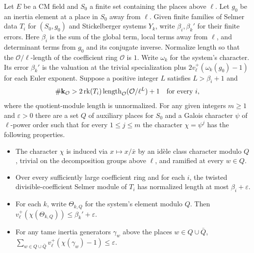 \begin{lemma}
\label{lem:c-selmer-general-twist}
\emitthmsource
Let $E$ be a CM field and $S_0$ a finite set containing the places above $\ell$. Let $g_0$ be an inertia element at a place in $S_0$ away from $\ell$. Given finite families of Selmer data $T_i$ for $(S_0,g_0)$ and Stickelberger systems $Y_k$, write $\beta_i,\beta_k'$ for their finite errors. Here $\beta_i$ is the sum of the global term, local terms away from $\ell$, and determinant terms from $g_0$ and its conjugate inverse. Normalize length so that the $\mathcal O/\ell$-length of the coefficient ring $\mathcal O$ is $1$. Write $\omega_k$ for the system's character. Its error $\beta_k'$ is the valuation at the trivial specialization plus $2v_\ell^+(\omega_k(g_0)-1)$ for each Euler exponent. Suppose a positive integer $L$ satisfies $L>\beta_i+1$ and
\[
 \#\mathbf k_{\mathcal O}>2\operatorname{rk}(T_i)\operatorname{length}_{\mathcal O}(\mathcal O/\ell^L)+1
 \quad\hbox{for every }i ,
\]
where the quotient-module length is unnormalized. For any given integers $m\ge1$ and $\varepsilon>0$ there are a set $Q$ of auxiliary places for $S_0$ and a Galois character $\psi$ of $\ell$-power order such that for every $1\le j\le m$ the character $\chi=\psi^j$ has the following properties.

\begin{itemize}
\item The character $\chi$ is induced via $x\mapsto x/\bar x$ by an idèle class character modulo $Q$, trivial on the decomposition groups above $\ell$, and ramified at every $w\in Q$.
\item Over every sufficiently large coefficient ring and for each $i$, the twisted divisible-coefficient Selmer module of $T_i$ has normalized length at most $\beta_i+\varepsilon$.
\item For each $k$, write $\Theta_{k,Q}$ for the system's element modulo $Q$. Then $v_\ell^+(\chi(\Theta_{k,Q}))\le\beta_k'+\varepsilon$.
\item For any tame inertia generators $\gamma_w$ above the places $w\in Q\cup\bar Q$,
$\sum_{w\in Q\cup\bar Q}v_\ell^+(\chi(\gamma_w)-1)\le\varepsilon$.
\end{itemize}
\end{lemma}

